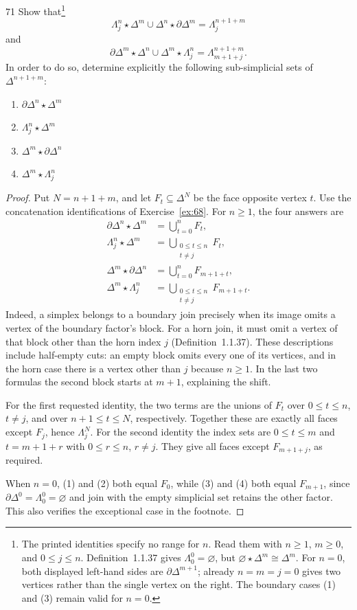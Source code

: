 \begin{exercise}{71}
Show that\footnote{The printed identities specify no range for $n$.
Read them with $n\ge1$, $m\ge0$, and $0\le j\le n$.
Definition~1.1.37 gives $\Lambda^0_0=\varnothing$,
but $\varnothing\star\Delta^m\cong\Delta^m$.
For $n=0$, both displayed left-hand sides are
$\partial\Delta^{m+1}$; already $n=m=j=0$ gives two
vertices rather than the single vertex on the right.
The boundary cases (1) and (3) remain valid for $n=0$.}
\[
 \Lambda^n_j\star\Delta^m\cup\Delta^n\star\partial\Delta^m
 =\Lambda^{n+1+m}_j
\]
and
\[
 \partial\Delta^m\star\Delta^n\cup\Delta^m\star\Lambda^n_j
 =\Lambda^{n+1+m}_{m+1+j}.
\]
In order to do so, determine explicitly the following sub-simplicial sets of $\Delta^{n+1+m}$:
\begin{enumerate}[label=(\arabic*)]
 \item $\partial\Delta^n\star\Delta^m$
 \item $\Lambda^n_j\star\Delta^m$
 \item $\Delta^m\star\partial\Delta^n$
 \item $\Delta^m\star\Lambda^n_j$
\end{enumerate}

\begin{proof}
Put $N=n+1+m$, and let $F_t\subseteq\Delta^N$ be the
face opposite vertex $t$.
Use the concatenation identifications of
Exercise~\ref{ex:68}.
For $n\ge1$, the four answers are
\[
\begin{aligned}
 \partial\Delta^n\star\Delta^m
   &=\bigcup_{t=0}^{n}F_t,\\
 \Lambda^n_j\star\Delta^m
   &=\bigcup_{\substack{0\le t\le n\\t\ne j}}F_t,\\
 \Delta^m\star\partial\Delta^n
   &=\bigcup_{t=0}^{n}F_{m+1+t},\\
 \Delta^m\star\Lambda^n_j
   &=\bigcup_{\substack{0\le t\le n\\t\ne j}}F_{m+1+t}.
\end{aligned}
\]
Indeed, a simplex belongs to a boundary join precisely
when its image omits a vertex of the boundary factor's
block.
For a horn join, it must omit a vertex of that block
other than the horn index $j$
(Definition~1.1.37).
These descriptions include half-empty cuts: an empty
block omits every one of its vertices, and in the horn
case there is a vertex other than $j$ because $n\ge1$.
In the last two formulas the second block starts at
$m+1$, explaining the shift.

For the first requested identity, the two terms are
the unions of $F_t$ over $0\le t\le n$, $t\ne j$,
and over $n+1\le t\le N$, respectively.
Together these are exactly all faces except $F_j$,
hence $\Lambda^N_j$.
For the second identity the index sets are
$0\le t\le m$ and $t=m+1+r$ with $0\le r\le n$,
$r\ne j$.
They give all faces except $F_{m+1+j}$, as required.

When $n=0$, (1) and (2) both equal $F_0$, while
(3) and (4) both equal $F_{m+1}$, since
$\partial\Delta^0=\Lambda^0_0=\varnothing$ and join
with the empty simplicial set retains the other factor.
This also verifies the exceptional case in the footnote.
\end{proof}
\end{exercise}
